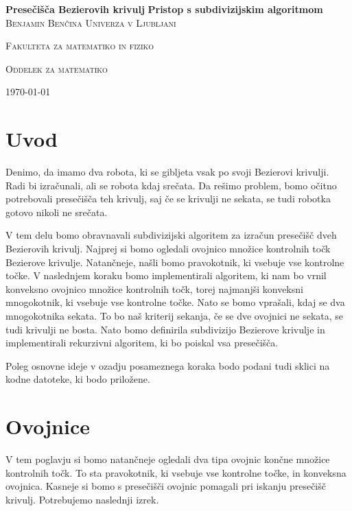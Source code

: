 \documentclass[a4paper, 12pt]{article} %
\begin{document}
\begin{titlepage}
\centering
\textbf{\Huge{Presečišča Bezierovih krivulj}}
\vfill
\textbf{\LARGE{Pristop s subdivizijskim algoritmom}}
\vfill\vfill
\textsc{\Large{Benjamin Benčina}}
\vfill\vfill
\textsc{\large{Univerza v Ljubljani}}

\textsc{\large{Fakulteta za matematiko in fiziko}}

\textsc{\large{Oddelek za matematiko}}
\vfill\vfill\vfill
	
{\large\today}

\end{titlepage}

\tableofcontents
\newpage

\section{Uvod}

Denimo, da imamo dva robota, ki se gibljeta vsak po svoji Bezierovi krivulji. Radi bi izračunali, ali se robota kdaj srečata. Da rešimo problem, bomo očitno potrebovali presečišča teh krivulj, saj če se krivulji ne sekata, se tudi robotka gotovo nikoli ne srečata.

V tem delu bomo obravnavali subdivizijski algoritem za izračun presečišč dveh Bezierovih krivulj. Najprej si bomo ogledali ovojnico množice kontrolnih točk Bezierove krivulje. Natančneje, našli bomo pravokotnik, ki vsebuje vse kontrolne točke. V naslednjem koraku bomo implementirali algoritem, ki nam bo vrnil konveksno ovojnico množice kontrolnih točk, torej najmanjši konveksni mnogokotnik, ki vsebuje vse kontrolne točke. Nato se bomo vprašali, kdaj se dva mnogokotnika sekata. To bo naš kriterij sekanja, če se dve ovojnici ne sekata, se tudi krivulji ne bosta. Nato bomo definirila subdivizijo Bezierove krivulje in implementirali rekurzivni algoritem, ki bo poiskal vsa presečišča.

Poleg osnovne ideje v ozadju posameznega koraka bodo podani tudi sklici na kodne datoteke, ki bodo priložene.

\section{Ovojnice}

V tem poglavju si bomo natančneje ogledali dva tipa ovojnic končne množice kontrolnih točk. To sta pravokotnik, ki vsebuje vse kontrolne točke, in konveksna ovojnica. Kasneje si bomo s presečišči ovojnic pomagali pri iskanju presečišč krivulj. Potrebujemo naslednji izrek.
\end{document}

